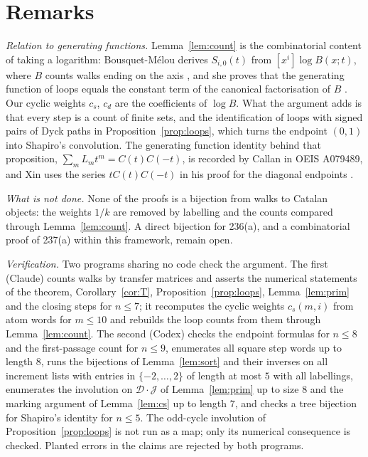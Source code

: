 \documentclass[11pt]{amsart}
\theoremstyle{definition}
\theoremstyle{remark}
\begin{document}
\section{Remarks}\label{sec:remarks}

\emph{Relation to generating functions.} Lemma~\ref{lem:count} is the combinatorial content of taking a logarithm:
Bousquet-M\'elou derives $S_{i,0}(t)$ from $[x^i]\log B(x;t)$, where $B$ counts walks ending on the axis
\cite[Prop.~9]{BM}, and she proves that the generating function of loops equals the constant term of the canonical
factorisation of $B$ \cite[Thm.~12]{BM}. Our cyclic weights $c_s$, $c_d$ are the coefficients of $\log B$. What the
argument adds is that every step is a count of finite sets, and the identification of loops with signed pairs of Dyck
paths in Proposition~\ref{prop:loops}, which turns the endpoint $(0,1)$ into Shapiro's convolution. The generating
function identity behind that proposition, $\sum_mL_mt^m=C(t)C(-t)$, is recorded by Callan in OEIS A079489, and Xin
uses the series $tC(t)C(-t)$ in his proof for the diagonal endpoints \cite{Xin}.

\emph{What is not done.} None of the proofs is a bijection from walks to Catalan objects: the weights $1/k$ are removed
by labelling and the counts compared through Lemma~\ref{lem:count}. A direct bijection
for 236(a), and a combinatorial proof of 237(a) within this framework, remain open.

\emph{Verification.} Two programs sharing no code check the argument. The first (Claude) counts walks by transfer
matrices and asserts the numerical statements of the theorem, Corollary~\ref{cor:T}, Proposition~\ref{prop:loops},
Lemma~\ref{lem:prim} and the closing steps for $n\le7$; it recomputes the cyclic weights $c_s(m,i)$ from atom words for
$m\le10$ and rebuilds the loop counts from them through Lemma~\ref{lem:count}. The second (Codex) checks the endpoint
formulas for $n\le8$ and the first-passage count for $n\le9$, enumerates all square step words up to length $8$, runs
the bijections of Lemma~\ref{lem:sort} and their inverses on all increment lists with entries in $\{-2,\dots,2\}$ of
length at most $5$ with all labellings, enumerates the involution on $\mathcal D\cdot\mathcal J$ of
Lemma~\ref{lem:prim} up to size $8$ and the marking argument of Lemma~\ref{lem:cs} up to length $7$, and checks a tree
bijection for Shapiro's identity for $n\le5$. The odd-cycle involution of Proposition~\ref{prop:loops} is not run as
a map; only its numerical consequence is checked. Planted errors in the claims are rejected by both programs.
\end{document}
